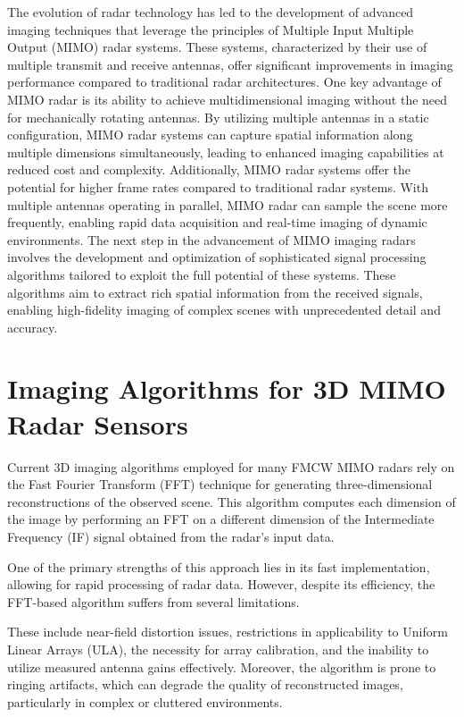 The evolution of radar technology has led to the development of advanced imaging techniques
that leverage the principles of Multiple Input Multiple Output (MIMO) radar systems.
These systems, characterized by their use of multiple transmit and receive antennas,
offer significant improvements in imaging performance compared to traditional radar architectures.
One key advantage of MIMO radar is its ability to achieve multidimensional imaging without the need for
mechanically rotating antennas. By utilizing multiple antennas in a static configuration,
MIMO radar systems can capture spatial information along multiple dimensions simultaneously,
leading to enhanced imaging capabilities at reduced cost and complexity. Additionally,
MIMO radar systems offer the potential for higher frame rates compared to traditional radar systems.
With multiple antennas operating in parallel, MIMO radar can sample the scene more frequently,
enabling rapid data acquisition and real-time imaging of dynamic environments.
The next step in the advancement of MIMO imaging radars involves the development and optimization
of sophisticated signal processing algorithms tailored to exploit the full potential of these systems.
These algorithms aim to extract rich spatial information from the received signals,
enabling high-fidelity imaging of complex scenes with unprecedented detail and accuracy. \\

\section{Imaging Algorithms for 3D MIMO Radar Sensors}
Current 3D imaging algorithms employed for many FMCW MIMO radars rely on the Fast Fourier Transform (FFT)
technique for generating three-dimensional reconstructions of the observed scene.
This algorithm computes each dimension of the image by performing an FFT on a different dimension
of the Intermediate Frequency (IF) signal obtained from the radar's input data.

One of the primary strengths of this approach lies in its fast implementation,
allowing for rapid processing of radar data. However, despite its efficiency,
the FFT-based algorithm suffers from several limitations.

These include near-field distortion issues,
restrictions in applicability to Uniform Linear Arrays (ULA),
the necessity for array calibration, and the inability to utilize measured antenna gains effectively.
Moreover, the algorithm is prone to ringing artifacts, which can degrade the quality of reconstructed images,
particularly in complex or cluttered environments. \\


